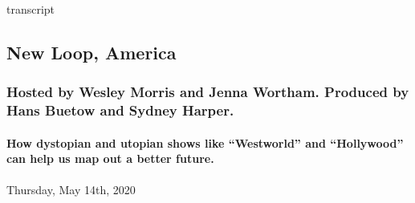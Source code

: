 transcript

\hypertarget{new-loop-america-2}{%
\subsection{New Loop, America}\label{new-loop-america-2}}

\hypertarget{hosted-by-wesley-morris-and-jenna-wortham-produced-by-hans-buetow-and-sydney-harper-1}{%
\subsubsection{Hosted by Wesley Morris and Jenna Wortham. Produced by
Hans Buetow and Sydney
Harper.}\label{hosted-by-wesley-morris-and-jenna-wortham-produced-by-hans-buetow-and-sydney-harper-1}}

\hypertarget{how-dystopian-and-utopian-shows-like-westworld-and-hollywood-can-help-us-map-out-a-better-future-2}{%
\paragraph{How dystopian and utopian shows like ``Westworld'' and
``Hollywood'' can help us map out a better
future.}\label{how-dystopian-and-utopian-shows-like-westworld-and-hollywood-can-help-us-map-out-a-better-future-2}}

Thursday, May 14th, 2020

